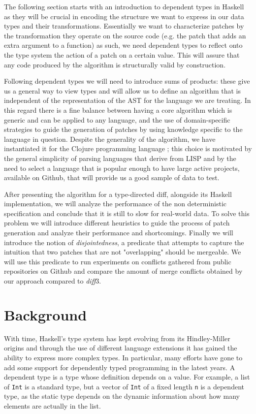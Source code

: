 \documentclass[11pt, titlepage]{article}
\newcommand{\toHaskell}[1]{\texttt{#1}\xspace}
\newcommand{\diff}{\emph{diff}}
\begin{document}
The following section starts with an introduction to dependent types in Haskell as they will be crucial in encoding the structure we want to express in our data types and their transformations. 
Essentially we want to characterize patches by the transformation they operate on the source code (e.g. the patch that adds an extra argument to a function) as such, we need dependent types to reflect onto the type system the action of a patch on a certain value. This will assure that any code produced by the algorithm is structurally valid by construction.

Following dependent types we will need to introduce sums of products: these give us a general way to view types and will allow us to define an algorithm that is independent of the representation of the AST for the language we are treating. In this regard there is a fine balance between having a core algorithm which is generic and can be applied to any language, and the use of domain-specific strategies to guide the generation of patches by using knowledge specific to the language in question.
Despite the generality of the algorithm, we have instantiated it for the Clojure programming language \cite{clojure}; this choice is motivated by the general simplicity of parsing languages that derive from LISP and by the need to select a language that is popular enough to have large active projects, available on Github, that will provide us a good sample of data to test.

After presenting the algorithm for a type-directed diff, alongside its Haskell implementation, we will analyze the performance of the non deterministic specification and conclude that it is still to slow for real-world data. 
To solve this problem we will introduce different heuristics to guide the process of patch generation and analyze their performance and shortcomings.
Finally we will introduce the notion of \emph{disjointedness}, a predicate that attempts to capture the intuition that two patches that are not "overlapping" should be mergeable. We will use this predicate to run experiments on conflicts gathered from public repositories on Github and compare the amount of merge conflicts obtained by our approach compared to \diff3.

\section{Background}\label{dependent-types-in-haskell}

With time, Haskell's type system has kept evolving from its Hindley-Miller origins and through the use of different language extensions it has gained the ability to express more complex types. In particular, many efforts have gone to add some support for dependently typed programming in the latest years. A dependent type is a type whose definition depends on a value. For example, a list of \toHaskell{Int} is a standard type, but a vector of \toHaskell{Int} of a fixed length \toHaskell{n} is a dependent type, as the static type depends on the dynamic information about how many elements are actually in the list.
\end{document}
